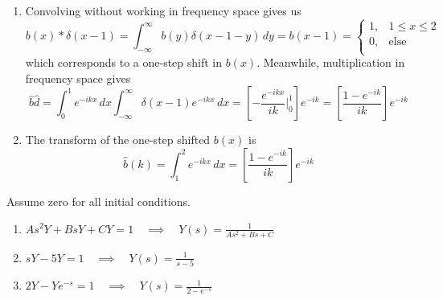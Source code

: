 \documentclass[a4paper]{article}
\begin{document}

\begin{enumerate}[label=(\alph*)]
	\item Convolving without working in frequency space gives us
	\[
		 b \!\left( x \right) * \delta \!\left( x - 1 \right) = \int^{\infty}_{-\infty} b \!\left( y \right) \delta \!\left( x - 1 - y \right) \, dy = b \!\left( x - 1 \right) = \begin{cases}
		 	1, & 1 \le x \le 2 \\
		 	0, & \text{else} \\
		 \end{cases}
	\]
	which corresponds to a one-step shift in \( b \!\left( x \right) \). Meanwhile, multiplication in frequency space gives
	\[
		\hat{b}\hat{d} = \int^{1}_{0} e^{-ikx} \, dx \int^{\infty}_{-\infty} \delta \!\left( x - 1 \right)e^{-ikx} \, dx = \!\left[ -\frac{e^{-ikx}}{ik} \Big|^{1}_{0} \right]e^{-ik} = \!\left[ \frac{1 - e^{-ik}}{ik} \right]e^{-ik}
	\]
	\item The transform of the one-step shifted \( b \!\left( x \right) \) is
	\[
		\hat{b}\!\left( k \right) = \int^{2}_{1} e^{-ikx} \, dx = \!\left[ \frac{1 - e^{-ik}}{ik} \right]e^{-ik} 
	\]
\end{enumerate}

Assume zero for all initial conditions.
\begin{enumerate}[label=(\alph*)]
	\item \( As^{2}Y + BsY + CY = 1 \quad \implies \quad Y \!\left( s \right) = \displaystyle{\frac{1}{As^{2} + Bs + C}} \)
	\item \( sY - 5Y = 1 \quad \implies \quad Y \!\left( s \right) = \displaystyle{\frac{1}{s - 5}} \)
	\item \( 2Y - Ye^{-s} = 1 \quad \implies \quad Y \!\left( s \right) = \displaystyle{\frac{1}{2 - e^{-s}}} \)
\end{enumerate}
\end{document}
